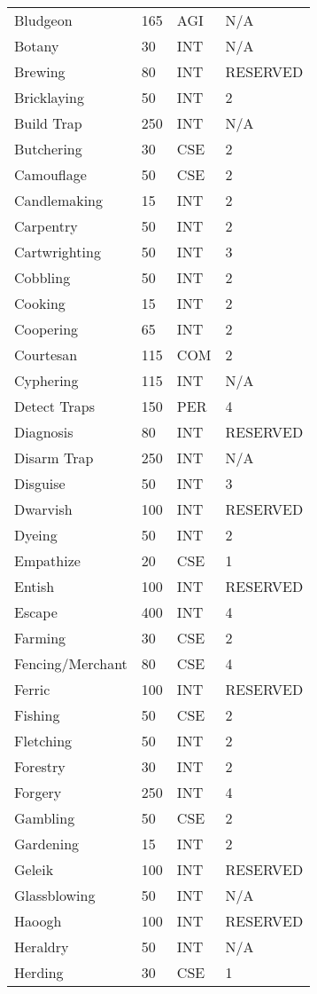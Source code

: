 \begin{multicols*}{2}
\begin{tcolorbox}[breakable,boxrule=0pt]
\begin{xtabular}{l l l l}
Bludgeon & 165 & AGI & N/A \\
Botany & 30 & INT & N/A \\
Brewing & 80 & INT & RESERVED \\
Bricklaying & 50 & INT & 2 \\
Build Trap & 250 & INT & N/A \\
Butchering & 30 & CSE & 2 \\
Camouflage & 50 & CSE & 2 \\
Candlemaking & 15 & INT & 2 \\
Carpentry & 50 & INT & 2 \\
Cartwrighting & 50 & INT & 3 \\
Cobbling & 50 & INT & 2 \\
Cooking & 15 & INT & 2 \\
Coopering & 65 & INT & 2 \\
Courtesan & 115 & COM & 2 \\
Cyphering & 115 & INT & N/A \\
Detect Traps & 150 & PER & 4 \\
Diagnosis & 80 & INT & RESERVED \\
Disarm Trap & 250 & INT & N/A \\
Disguise & 50 & INT & 3 \\
Dwarvish & 100 & INT & RESERVED \\
Dyeing & 50 & INT & 2 \\
Empathize & 20 & CSE & 1 \\
Entish & 100 & INT & RESERVED \\
Escape & 400 & INT & 4 \\
Farming & 30 & CSE & 2 \\
Fencing/Merchant & 80 & CSE & 4 \\
Ferric & 100 & INT & RESERVED \\
Fishing & 50 & CSE & 2 \\
Fletching & 50 & INT & 2 \\
Forestry & 30 & INT & 2 \\
Forgery & 250 & INT & 4 \\
Gambling & 50 & CSE & 2 \\
Gardening & 15 & INT & 2 \\
Geleik & 100 & INT & RESERVED \\
Glassblowing & 50 & INT & N/A \\
Haoogh & 100 & INT & RESERVED \\
Heraldry & 50 & INT & N/A \\
Herding & 30 & CSE & 1 \\

\end{xtabular}
\end{tcolorbox}
\end{multicols*}
